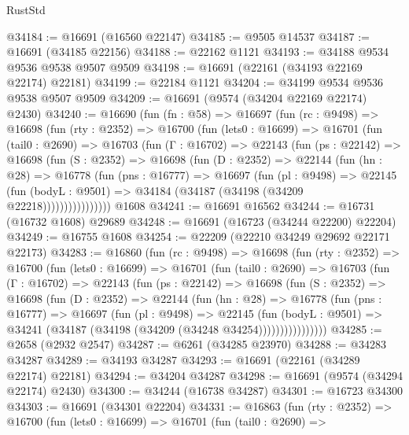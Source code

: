 \begin{lexlean}{RustStd}
\begin{coremodule}
@34184 := @16691 (@16560 @22147)
@34185 := @9505 @14537
@34187 := @16691 (@34185 @22156)
@34188 := @22162 @1121
@34193 := @34188 @9534 @9536 @9538 @9507 @9509
@34198 := @16691 (@22161 (@34193 @22169 @22174) @22181)
@34199 := @22184 @1121
@34204 := @34199 @9534 @9536 @9538 @9507 @9509
@34209 := @16691 (@9574 (@34204 @22169 @22174) @2430)
@34240 := @16690
    (fun (fn : @58) =>
    @16697
      (fun (rc : @9498) =>
      @16698
        (fun (rty : @2352) =>
        @16700
          (fun (lets0 : @16699) =>
          @16701
            (fun (tail0 : @2690) =>
            @16703
              (fun (Γ : @16702) =>
              @22143
                (fun (ps : @22142) =>
                @16698
                  (fun (S : @2352) =>
                  @16698
                    (fun (D : @2352) =>
                    @22144
                      (fun (hn : @28) =>
                      @16778
                        (fun (pns : @16777) =>
                        @16697
                          (fun (pl : @9498) =>
                          @22145
                            (fun (bodyL : @9501) =>
                            @34184 (@34187 (@34198 (@34209 @22218))))))))))))))))
    @1608
@34241 := @16691 @16562
@34244 := @16731 (@16732 @1608) @29689
@34248 := @16691 (@16723 (@34244 @22200) @22204)
@34249 := @16755 @1608
@34254 := @22209 (@22210 @34249 @29692 @22171 @22173)
@34283 := @16860
    (fun (rc : @9498) =>
    @16698
      (fun (rty : @2352) =>
      @16700
        (fun (lets0 : @16699) =>
        @16701
          (fun (tail0 : @2690) =>
          @16703
            (fun (Γ : @16702) =>
            @22143
              (fun (ps : @22142) =>
              @16698
                (fun (S : @2352) =>
                @16698
                  (fun (D : @2352) =>
                  @22144
                    (fun (hn : @28) =>
                    @16778
                      (fun (pns : @16777) =>
                      @16697
                        (fun (pl : @9498) =>
                        @22145
                          (fun (bodyL : @9501) =>
                          @34241 (@34187 (@34198 (@34209 (@34248 @34254))))))))))))))))
@34285 := @2658 (@2932 @2547)
@34287 := @6261 (@34285 @23970)
@34288 := @34283 @34287
@34289 := @34193 @34287
@34293 := @16691 (@22161 (@34289 @22174) @22181)
@34294 := @34204 @34287
@34298 := @16691 (@9574 (@34294 @22174) @2430)
@34300 := @34244 (@16738 @34287)
@34301 := @16723 @34300
@34303 := @16691 (@34301 @22204)
@34331 := @16863
    (fun (rty : @2352) =>
    @16700
      (fun (lets0 : @16699) =>
      @16701
        (fun (tail0 : @2690) =>

\end{coremodule}
\end{lexlean}
